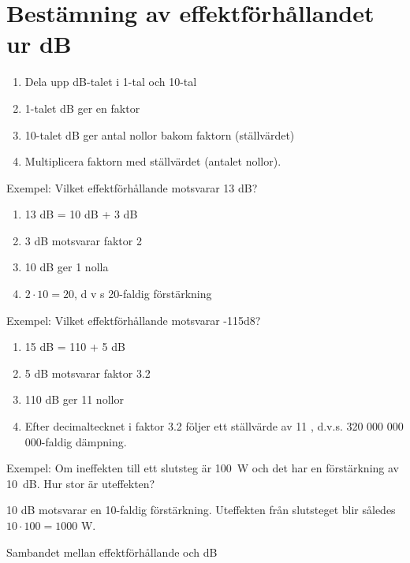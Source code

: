 \section{Bestämning av effektförhållandet ur dB}

\begin{rev-raderas}

\begin{enumerate}
\item Dela upp dB-talet i 1-tal och 10-tal
\item 1-talet dB ger en faktor
\item 10-talet dB ger antal nollor bakom faktorn (ställvärdet)
\item Multiplicera faktorn med ställvärdet (antalet nollor).
\end{enumerate}

Exempel: Vilket effektförhållande motsvarar 13 dB?

\begin{enumerate}
\item 13 dB = 10 dB + 3 dB
\item 3 dB motsvarar faktor 2
\item 10 dB ger 1 nolla
\item \(2 \cdot 10 = 20\), d v s 20-faldig förstärkning
\end{enumerate}

Exempel: Vilket effektförhållande motsvarar -115d8?
\begin{enumerate}
\item 15 dB = 110 + 5 dB
\item 5 dB motsvarar faktor 3.2
\item 110 dB ger 11 nollor
\item Efter decimaltecknet i faktor 3.2 följer ett ställvärde av 11 ,
  d.v.s. 320 000 000 000-faldig dämpning.
\end{enumerate}

Exempel: Om ineffekten till ett slutsteg är 100~W och det har en
förstärkning av 10~dB.  Hur stor är uteffekten?

10 dB motsvarar en 10-faldig förstärkning.  Uteffekten från slutsteget
blir således \(10 \cdot 100 = 1000\) W.

Sambandet mellan effektförhållande och dB


\end{rev-raderas}
